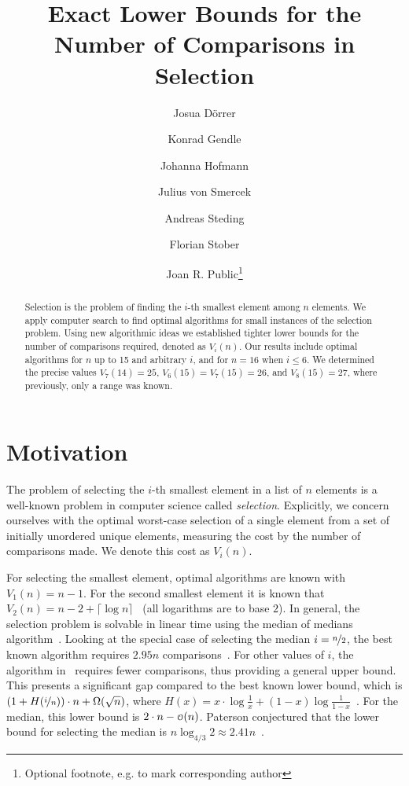 \documentclass[a4paper,UKenglish,cleveref, autoref, thm-restate]{lipics-v2021}
\title{\Large Exact Lower Bounds for the Number of Comparisons in Selection}
\author{Josua Dörrer}{University Stuttgart}{}{}{}
\author{Konrad Gendle}{University Stuttgart}{}{}{}
\author{Johanna Hofmann}{University Stuttgart}{}{}{}
\author{Julius von Smercek}{University Stuttgart}{}{}{}
\author{Andreas Steding}{University Stuttgart}{}{}{}
\author{Florian Stober}{University Stuttgart}{}{}{}
\author{Joan R. Public\footnote{Optional footnote, e.g. to mark corresponding author}}{Department of Informatics, Dummy College, [optional: Address], Country}{joanrpublic@dummycollege.org}{[orcid]}{[funding]}
\newcommand\smallO{
\mathchoice
{{\scriptstyle\mathcal{O}}}%
{{\scriptstyle\mathcal{O}}}%
{{\scriptscriptstyle\mathcal{O}}}%
{\scalebox{.50}{$\scriptscriptstyle\mathcal{O}$}}%
}
\begin{document}
\maketitle

\begin{abstract} \small\baselineskip=9pt
  Selection is the problem of finding the $i$-th smallest element among $n$ elements.
  We apply computer search to find optimal algorithms for small instances of the selection problem.
  Using new algorithmic ideas we established tighter lower bounds for the number of comparisons required, denoted as $V_i(n)$.
  Our results include optimal algorithms for $n$ up to 15 and arbitrary $i$, and for $n=16$ when $i \leq 6$.
  We determined the precise values $V_7(14) = 25$, $V_6(15) = V_7(15) = 26$, and $V_8(15) = 27$, where previously, only a range was known.

\end{abstract} %

\section{Motivation} \label{sec:motivation}

The problem of selecting the $i$-th smallest element in a list of $n$ elements is a well-known problem in computer science called \textit{selection}.
Explicitly, we concern ourselves with the optimal worst-case selection of a single element from a set of initially unordered unique elements, measuring the cost by the number of comparisons made.
We denote this cost as $V_i(n)$.

For selecting the smallest element, optimal algorithms are known with $V_1(n) = n - 1$.
For the second smallest element it is known that $V_2(n) = n - 2 + \lceil \log n\rceil$~\cite{Knuth1973} (all logarithms are to base $2$).
In general, the selection problem is solvable in linear time using the median of medians algorithm~\cite{Blum1972}.
Looking at the special case of selecting the median $i = \nicefrac{n}{2}$, the best known algorithm requires $2.95n$ comparisons~\cite{dor1999selecting}.
For other values of $i$, the algorithm in~\cite{dor1999selecting} requires fewer comparisons, thus providing a general upper bound.
This presents a significant gap compared to the best known lower bound, which is $\left (1 + H(\nicefrac{i}{n}) \right ) \cdot n + \Omega(\sqrt n)$, where $H(x) = x \cdot \log \frac{1}{x} + (1 - x) \log \frac{1}{1 - x}$~\cite{bent1985finding}.
For the median, this lower bound is $2 \cdot n - \smallO(n)$.
Paterson conjectured that the lower bound for selecting the median is $n \log_{4/3} 2 \approx 2.41n$~\cite{paterson1996progress}.
\end{document}
